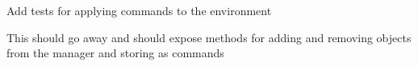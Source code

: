 
\begin{DoxyRefList}
\item[Member \mbox{\hyperlink{tesseract__environment__unit_8cpp_a7efd38cb7d246fd917d0181cc944ec94}{run\+Apply\+Commands\+Test}} ()]\label{todo__todo000002}%
%
Add tests for applying commands to the environment  
\item[Member \mbox{\hyperlink{classtesseract__environment_1_1Environment_a7f10ded105cbd32151631123466f8fbd}{tesseract\+\_\+environment\+::Environment\+::get\+Manipulator\+Manager}} ()]\label{todo__todo000001}%
%
This should go away and should expose methods for adding and removing objects from the manager and storing as commands 
\end{DoxyRefList}
